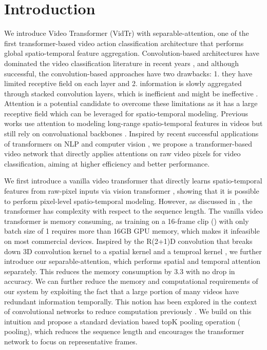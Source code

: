 \documentclass[10pt,twocolumn,letterpaper]{article}
\begin{document}
\section{Introduction}
We introduce Video Transformer (VidTr) with separable-attention, one of the first transformer-based video action classification architecture that performs global spatio-temporal feature aggregation.
Convolution-based architectures have dominated the video classification literature in recent years \cite{wang2018non,feichtenhofer2018slowfast,li2020directional}, and although successful, the convolution-based approaches have two drawbacks: 1. they have limited receptive field on each layer and 2. information is slowly aggregated through stacked convolution layers, which is inefficient and might be ineffective \cite{wang2018non,li2020nuta}. Attention is a potential candidate to overcome these limitations as it has a large receptive field which can be leveraged for spatio-temporal modeling. Previous works use attention to modeling long-range spatio-temporal features in videos but still rely on convoluational backbones \cite{wang2018non,li2020nuta}. Inspired by recent successful applications of transformers on NLP \cite{vaswani2017attention,devlin2018bert} and computer vision \cite{dosovitskiy2020image,touvron2020training}, we propose a transformer-based video network that directly applies attentions on raw video pixels for video classification, aiming at higher efficiency and better performance.

We first introduce a vanilla video transformer that directly learns spatio-temporal features from raw-pixel inputs via vision transformer \cite{dosovitskiy2020image}, showing that it is possible to perform pixel-level spatio-temporal modeling. However, as discussed in \cite{wu2019long}, the transformer has  complexity with respect to the sequence length. The vanilla video transformer is memory consuming, as training on a 16-frame clip () with only batch size of 1 requires more than 16GB GPU memory, which makes it infeasible on most commercial devices.
Inspired by the R(2+1)D convolution that breaks down 3D convolution kernel to a spatial kernel and a temproal kernel \cite{tran2018closer}, we further introduce our separable-attention, which performs spatial and temporal attention separately. This reduces the memory consumption by 3.3 with no drop in accuracy. We can further reduce the memory and computational requirements of our system by exploiting the fact that a large portion of many videos have redundant information temporally. This notion has been explored in the context of convolutional networks to reduce computation previously \cite{li2020directional}. We build on this intuition and propose a standard deviation based topK pooling operation ( pooling), which reduces the sequence length and encourages the transformer network to focus on representative frames.  
\end{document}
